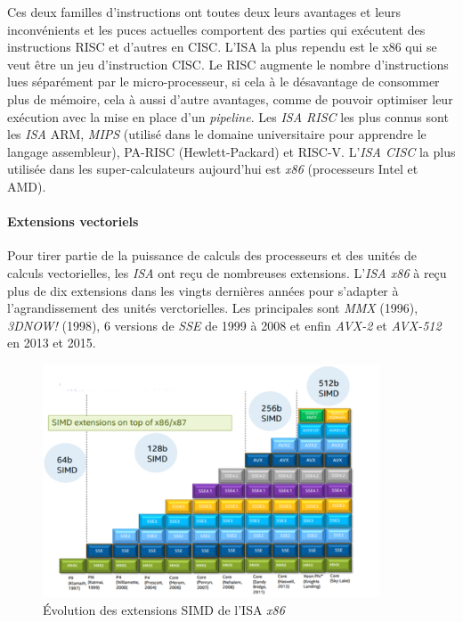 Ces deux familles d'instructions ont toutes deux leurs avantages et leurs inconvénients et les puces actuelles comportent des parties qui exécutent des instructions RISC et d'autres en CISC. L'ISA la plus rependu est le x86 qui se veut être un jeu d'instruction CISC. Le RISC augmente le nombre d'instructions lues séparément par le micro-processeur, si cela à le désavantage de consommer plus de mémoire, cela à aussi d'autre avantages, comme de pouvoir optimiser leur exécution avec la mise en place d'un \textit{pipeline}. Les \textit{ISA RISC} les plus connus sont les \textit{ISA} ARM, \textit{MIPS} (utilisé dans le domaine universitaire pour apprendre le langage assembleur), PA-RISC (Hewlett-Packard) et RISC-V. L'\textit{ISA CISC} la plus utilisée dans les super-calculateurs aujourd'hui est \textit{x86} (processeurs Intel et AMD).



\paragraph{Extensions vectoriels} Pour tirer partie de la puissance de calculs des processeurs et des unités de calculs vectorielles, les \textit{ISA} ont reçu de nombreuses extensions. L'\textit{ISA x86} à reçu plus de dix extensions dans les vingts dernières années pour s'adapter à l'agrandissement des unités verctorielles. Les principales sont \textit{MMX} (1996), \textit{3DNOW!} (1998), 6 versions de \textit{SSE} de 1999 à 2008 et enfin \textit{AVX-2} et \textit{AVX-512} en 2013 et 2015.

\begin{figure}
    \center
    \includegraphics[width=10cm]{images/processeur_archi.png}
    \caption{\label{processeur_archi} Évolution des extensions SIMD de l'ISA \textit{x86}}
\end{figure}







